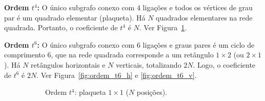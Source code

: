 \documentclass[11pt,a4paper]{article}
\begin{document}
\noindent\textbf{Ordem $t^4$:} O único subgrafo conexo com $4$ ligações e todos os vértices de grau par é um quadrado elementar (plaqueta). Há $N$ quadrados elementares na rede quadrada. Portanto, o coeficiente de $t^4$ é $N$. Ver Figura~\ref{fig:ordem_t4}.

\noindent\textbf{Ordem $t^6$:} O único subgrafo conexo com $6$ ligações e graus pares é um ciclo de comprimento $6$, que na rede quadrada corresponde a um retângulo $1\times 2$ (ou $2\times 1$). Há $N$ retângulos horizontais e $N$ verticais, totalizando $2N$. Logo, o coeficiente de $t^6$ é $2N$. Ver Figura~\ref{fig:ordem_t6_h} e \ref{fig:ordem_t6_v}.
%
\begin{figure}[htbp]
    \centering
    \begin{subfigure}[b]{0.31\textwidth}
        \centering
        \caption{Ordem $t^4$: plaqueta $1\times 1$ ($N$ posições).}
        \label{fig:ordem_t4}
    \end{subfigure}
    \hfill
    \begin{subfigure}[b]{0.33\textwidth}
        \centering
\end{subfigure}
\end{figure}
\end{document}
